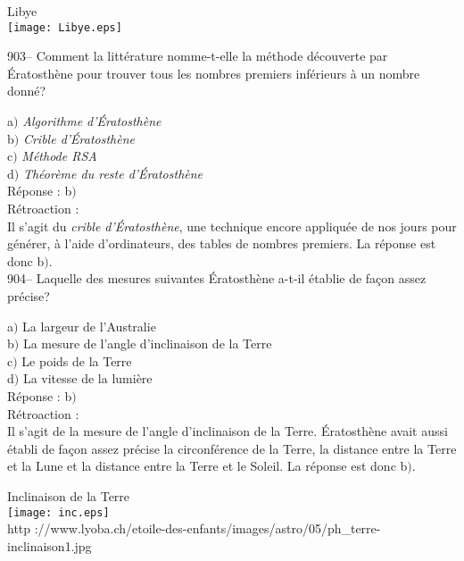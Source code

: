 ﻿\documentclass[letterpaper, 12pt]{article}
\begin{document}
        \begin{center}
        Libye\\
    \texttt{[image: Libye.eps]}\\
    \end{center}

903-- Comment la litt\'erature nomme-t-elle la m\'ethode d\'ecouverte par
\'Eratosth\`ene pour trouver
tous les nombres premiers inf\'erieurs \`a un nombre donn\'e?

a$)$ {\sl Algorithme d'\'Eratosth\`ene} \\
b$)$ {\sl Crible d'\'Eratosth\`ene} \\
c$)$ {\sl M\'ethode RSA} \\
d$)$ {\sl Th\'eor\`eme du reste d'\'Eratosth\`ene}\\

R\'eponse : b$)$\\

R\'etroaction : \\
Il s'agit du {\sl crible d'\'Eratosth\`ene}, une technique encore
appliqu\'ee de nos jours
pour g\'en\'erer, \`a l'aide d'ordinateurs, des tables de nombres premiers.
La r\'eponse est donc b$)$.\\

904-- Laquelle des mesures suivantes \'Eratosth\`ene a-t-il
\'etablie de fa\c con assez pr\'ecise?

a$)$ La largeur de l'Australie \\
b$)$ La mesure de l'angle d'inclinaison de la Terre \\
c$)$ Le poids de la Terre \\
d$)$ La vitesse de la lumi\`ere\\

R\'eponse : b$)$\\

R\'etroaction :\\
Il s'agit de la mesure de l'angle d'inclinaison de la Terre.
\'Eratosth\`ene avait aussi \'etabli de fa\c con assez pr\'ecise la
circonf\'erence de la Terre, la distance entre la Terre et la Lune
et la distance entre la
Terre et le Soleil. La r\'eponse est donc b$)$.\\

        \begin{center}
        Inclinaison de la Terre\\
    \texttt{[image: inc.eps]}\\
        {\footnotesize http
://www.lyoba.ch/etoile-des-enfants/images/astro/05/ph\_terre-inclinaison1.jpg}
    \end{center}
\end{document}
